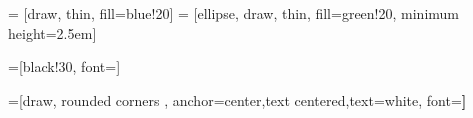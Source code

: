 
\usepackage[utf8]{inputenc}
\usepackage{lmodern}
\usepackage[T1]{fontenc}


\usepackage{array}
\usepackage{mathtools}%
\usepackage{wasysym}
\usepackage{amsfonts}
\usepackage{amssymb, amsbsy}
\usepackage[utf8]{inputenc}
\usepackage{graphicx}
\usepackage{multimedia}
\usepackage{multicol}
\usepackage{multirow}
\usepackage{fourier}
\usepackage{makecell}






\usepackage{tikz}
\usetikzlibrary{shapes,arrows,shadows,calc, angles}
\usetikzlibrary{arrows,shapes}
\usetikzlibrary{positioning}
\usetikzlibrary{patterns.meta}

\usetikzlibrary{decorations, decorations.pathreplacing}


\usepackage{verbatim}

 = [draw, thin, fill=blue!20]
 = [ellipse, draw, thin, fill=green!20, minimum height=2.5em]


\def\onlystyle<#1>#2#3{%
    \alt<#1>{%
        \tikzset{#2/.style = {#3}}
    }{%
        \tikzset{#2/.style = {}}
    }%
}

















\newcommand{\txw}{\textwidth}
\newcommand{\txh}{\textheight}
\newcommand{\midX}{0.5\textwidth}
\newcommand{\midY}{0.5\textheight}

\newcommand{\xPageNumber}{105mm}
\newcommand{\yPageNumber}{3mm}
=[black!30, font=\small]
\newcommand{\nodePageNumber}{ \node[stylePageNumber] at (\xPageNumber, \yPageNumber) {\insertframenumber} ; }

=[draw, rounded corners ,
anchor=center,text centered,text=white, font=\bfseries] %

